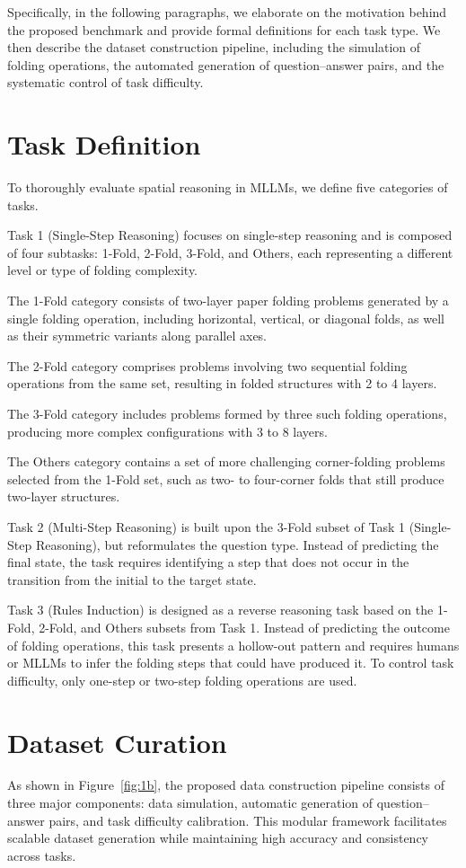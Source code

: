 \documentclass[letterpaper]{article} %
\begin{document}
Specifically, in the following paragraphs, we elaborate on the motivation behind the proposed benchmark and provide formal definitions for each task type. We then describe the dataset construction pipeline, including the simulation of folding operations, the automated generation of question–answer pairs, and the systematic control of task difficulty.
\section{Task Definition}
To thoroughly evaluate spatial reasoning in MLLMs, we define five categories of tasks.

Task 1 (Single-Step Reasoning) focuses on single-step reasoning and is composed of four subtasks: 1-Fold, 2-Fold, 3-Fold, and Others, each representing a different level or type of folding complexity.

The 1-Fold category consists of two-layer paper folding problems generated by a single folding operation, including horizontal, vertical, or diagonal folds, as well as their symmetric variants along parallel axes.

The 2-Fold category comprises problems involving two sequential folding operations from the same set, resulting in folded structures with 2 to 4 layers.

The 3-Fold category includes problems formed by three such folding operations, producing more complex configurations with 3 to 8 layers.

The Others category contains a set of more challenging corner-folding problems selected from the 1-Fold set, such as two- to four-corner folds that still produce two-layer structures.

Task 2 (Multi-Step Reasoning) is built upon the 3-Fold subset of Task 1 (Single-Step Reasoning), but reformulates the question type. Instead of predicting the final state, the task requires identifying a step that does not occur in the transition from the initial to the target state.

Task 3 (Rules Induction) is designed as a reverse reasoning task based on the 1-Fold, 2-Fold, and Others subsets from Task 1. Instead of predicting the outcome of folding operations, this task presents a hollow-out pattern and requires humans or MLLMs to infer the folding steps that could have produced it. To control task difficulty, only one-step or two-step folding operations are used.

\section{Dataset Curation}
As shown in Figure~\ref{fig:1b}, the proposed data construction pipeline consists of three major components: data simulation, automatic generation of question–answer pairs, and task difficulty calibration. This modular framework facilitates scalable dataset generation while maintaining high accuracy and consistency across tasks.
\end{document}
